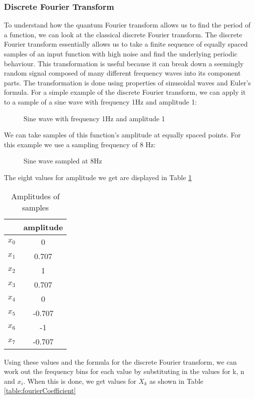 \subsubsection{Discrete Fourier Transform} 
To understand how the quantum Fourier transform allows us to find the period of a function, we can look at the classical discrete Fourier transform. The discrete Fourier transform essentially allows us to take a finite sequence of equally spaced samples of an input function with high noise and find the underlying periodic behaviour. This transformation is useful because it can break down a seemingly random signal composed of many different frequency waves into its component parts. The transformation is done using properties of sinusoidal waves and Euler's formula.
For a simple example of the discrete Fourier transform, we can apply it to a sample of a sine wave with frequency 1Hz and amplitude 1:
\begin{figure}[!htb]
\centering
\resizebox{7cm}{!}{}
\caption{Sine wave with frequency 1Hz and amplitude 1}
\label{fig:sine}
\end{figure}
We can take samples of this function's amplitude at equally spaced points. For this example we use a sampling frequency of 8 Hz:
\begin{figure}[!htb]
\centering
\resizebox{7cm}{!}{}
\caption{Sine wave sampled at 8Hz}
\label{fig:sineSample}
\end{figure}
The eight values for amplitude we get are displayed in Table \ref{table:amplitudes}
\begin{table}[!htb]
\centering
\begin{tabular}{ |c|c| } 
\hline
 & amplitude \\
\hline
$x_0$ & 0 \\ 
$x_1$ & 0.707 \\ 
$x_2$ & 1 \\ 
$x_3$ & 0.707 \\ 
$x_4$ & 0 \\ 
$x_5$ & -0.707 \\ 
$x_6$ & -1 \\ 
$x_7$ & -0.707 \\ 
\hline
\end{tabular}
\caption{Amplitudes of samples}
\label{table:amplitudes}
\end{table}
Using these values and the formula for the discrete Fourier transform, we can work out the frequency bins for each value by substituting in the values for k, n and $x_i$. When this is done, we get values for $X_k$ as shown in Table \ref{table:fourierCoefficient}
